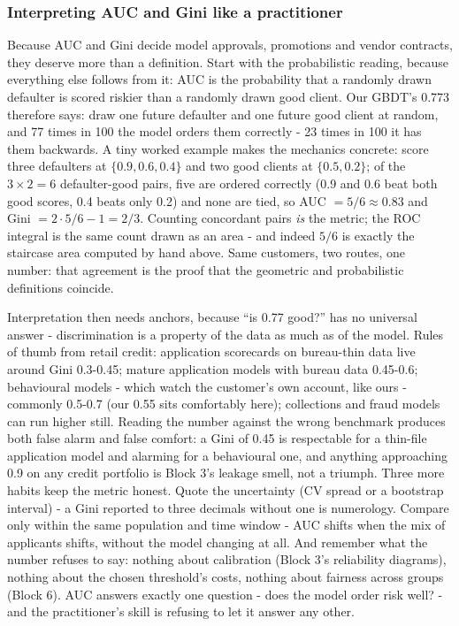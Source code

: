 \documentclass[11pt,a4paper]{article}
\begin{document}
\subsubsection{Interpreting AUC and Gini like a practitioner}
Because AUC and Gini decide model approvals, promotions and vendor
contracts, they deserve more than a definition. Start with the
probabilistic reading, because everything else follows from it: AUC is
the probability that a randomly drawn defaulter is scored riskier than a
randomly drawn good client. Our GBDT's 0.773 therefore says: draw one
future defaulter and one future good client at random, and 77 times in
100 the model orders them correctly - 23 times in 100 it has them
backwards. A tiny worked example makes the mechanics concrete: score
three defaulters at $\{0.9, 0.6, 0.4\}$ and two good clients at
$\{0.5, 0.2\}$; of the $3 \times 2 = 6$ defaulter-good pairs, five are
ordered correctly (0.9 and 0.6 beat both good scores, 0.4 beats only
0.2) and none are tied, so AUC $= 5/6 \approx 0.83$ and Gini
$= 2 \cdot 5/6 - 1 = 2/3$. Counting concordant pairs \emph{is} the
metric; the ROC integral is the same count drawn as an area - and
indeed $5/6$ is exactly the staircase area computed by hand above.
Same customers, two routes, one number: that agreement is the proof
that the geometric and probabilistic definitions coincide.

Interpretation then needs anchors, because ``is 0.77 good?'' has no
universal answer - discrimination is a property of the data as much as
of the model. Rules of thumb from retail credit: application scorecards
on bureau-thin data live around Gini 0.3-0.45; mature application
models with bureau data 0.45-0.6; behavioural models - which watch the
customer's own account, like ours - commonly 0.5-0.7 (our 0.55 sits
comfortably here); collections and fraud models can run higher still.
Reading the number against the wrong benchmark produces both false
alarm and false comfort: a Gini of 0.45 is respectable for a thin-file
application model and alarming for a behavioural one, and anything
approaching 0.9 on any credit portfolio is Block 3's leakage smell, not
a triumph. Three more habits keep the metric honest. Quote the
uncertainty (CV spread or a bootstrap interval) - a Gini reported to
three decimals without one is numerology. Compare only within the same
population and time window - AUC shifts when the mix of applicants
shifts, without the model changing at all. And remember what the number
refuses to say: nothing about calibration (Block 3's reliability
diagrams), nothing about the chosen threshold's costs, nothing about
fairness across groups (Block 6). AUC answers exactly one question -
does the model order risk well? - and the practitioner's skill is
refusing to let it answer any other.
\end{document}
